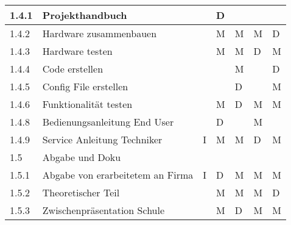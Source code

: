 \begin{longtable}{p{} p{} p{}  p{} p{} p{} p{}}
	1.4.1 & Projekthandbuch & & D & & &  \\ \midrule
	1.4.2 & Hardware zusammenbauen & & M & M & M & D \\ \midrule
	1.4.3 & Hardware testen & & M & M & D & M \\ \midrule
	1.4.4 & Code erstellen & & & M & & D \\ \midrule
	1.4.5 & Config File erstellen & & & D & & M \\ \midrule
	1.4.6 & Funktionalität testen & & M & D & M  & M \\ \midrule
	1.4.8 & Bedienungsanleitung End User & & D & & M & \\ \midrule
	1.4.9 & Service Anleitung Techniker & I & M & M & D & M \\ \midrule
	\rowcolor{mygray2}1.5 & Abgabe und Doku & & & & & \\ \midrule
	1.5.1 & Abgabe von erarbeitetem an Firma & I & D & M & M & M \\ \midrule
	1.5.2 & Theoretischer Teil & & M & M & M & D \\ 
	1.5.3 & Zwischenpräsentation Schule & & M & D & M & M \\ \midrule
\end{longtable}